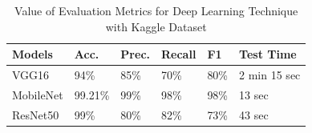 \begin{table}[h]
\centering
\caption{Value of Evaluation Metrics for Deep Learning Technique with Kaggle Dataset}
\captionsetup[table]{skip=10pt}
\label{table:sample_tweet}

{
\begin{tabular}{llllll}
\hline
Models & Acc.   & Prec.  & Recall & F1 & Test Time   \\ \hline
VGG16        & 94\%  & 85\% & 70\%  & 80\% & 2 min 15 sec\\
MobileNet          & 99.21\% & 99\% & 98\%  & 98\% & 13 sec\\
ResNet50       & 99\% & 80\% & 82\% & 73\% & 43 sec\\
 \hline
\end{tabular}
}
\label{table:deep-kaggle}
\end{table}